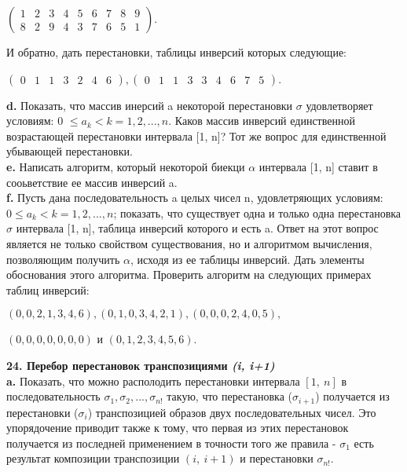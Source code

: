 \begin{center}
$\begin{pmatrix}
1 & 2 & 3 & 4 & 5 & 6 & 7 & 8 & 9\\
8 & 2 & 9 & 4 & 3 & 7 & 6 & 5 & 1
\end{pmatrix}$.
\end{center}
И обратно, дать перестановки, таблицы инверсий которых следующие:
\begin{center}
$\begin{pmatrix}
0 & 1 & 1 & 3 & 2 & 4 & 6
\end{pmatrix}, 
\begin{pmatrix}
0 & 1 & 1 & 3 & 3 & 4 & 6 & 7 & 5
\end{pmatrix}$.
\end{center}
\hspace*{15pt}\textbf{d.} Показать, что массив инерсий a некоторой перестановки $\sigma$  удовлетворяет условиям: 0 $\leqslant a_{k} <  k = 1, 2, ... , n.$ Каков массив инверсий единственной возрастающей перестановки интервала [1, n]? Тот же вопрос для единственной убывающей перестановки.\\

\textbf{e.} Написать алгоритм, который некоторой биекци $\alpha$ интервала [1, n] ставит в сооьветствие ее массив инверсий a.\\

\textbf{f.} Пусть дана последовательность a целых чисел n, удовлетряющих условиям: $0 \leqslant a_{k} <  k = 1, 2, ... , n$; показать, что существует одна и только одна перестановка $\sigma$ интервала [1, n], таблица инверсий которого и есть a. Ответ на этот вопрос является не только свойством существования, но и алгоритмом вычисления, позволяющим получить $\alpha$, исходя из ее таблицы инверсий. Дать элементы обоснования этого алгоритма.\newline
\hspace*{15pt}Проверить алгоритм на следующих примерах таблиц инверсий:
\begin{center}
$(0, 0, 2, 1, 3, 4, 6), (0, 1, 0, 3, 4, 2, 1), (0, 0, 0, 2, 4, 0, 5),$
\end{center}
\begin{center}
$(0, 0, 0, 0, 0, 0, 0)$ и $(0, 1, 2, 3, 4, 5, 6).$
\end{center}
\textbf{24. Перебор перестановок транспозициями \textit{(i, i+1)}}\\

\textbf{a.} Показать, что можно располодить перестановки интервала $[1,\: n]$ в последовательность $\sigma_{1}, \sigma_{2}, ... , \sigma_{n!}$ такую, что перестановка ($\sigma_{i+1}$) получается из перестановки ($\sigma_{i}$) транспозицией образов двух последовательных чисел. Это упорядочение приводит также к тому, что первая из этих перестановок получается из последней применением в точности того же правила - $\sigma_{1}$ есть результат композиции транспозиции $(i,\: i+1)$ и перестановки $\sigma_{n!}$.\\

